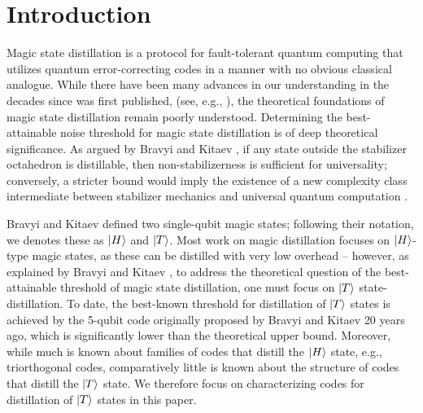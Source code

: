 \documentclass[11pt]{article}
\def\ket#1{\mathinner{|{#1}\rangle}}
\begin{document}
\eject \tableofcontents

\clearpage


\section{Introduction}
\label{Intro}


Magic state distillation \cite{MSD, knill2004faulttolerant} is a protocol for fault-tolerant quantum computing that utilizes quantum error-correcting codes in a manner with no obvious classical analogue. While there have been many advances in our understanding in the decades since \cite{MSD} was first published, (see, e.g., \cite{reichardt2005quantum, Reichardt_2009, ACB, CampbellAnwarBrowne, campbellEnhanced, PhysRevA.86.052329, PhysRevLett.120.050504, Haah2018codesprotocols, 2020golay, prakash2024low, nguyen2024quantum,wills2024constant, golowich2024asymptotically, tamiya2024polylog}), the theoretical foundations of magic state distillation remain poorly understood. Determining the best-attainable noise threshold for magic state distillation is of deep theoretical significance. As argued by Bravyi and Kitaev \cite{MSD}, if any state outside the stabilizer octahedron is distillable, then non-stabilizerness is sufficient for universality; conversely, a stricter bound would imply the existence of a new complexity class intermediate between stabilizer mechanics and universal quantum computation \cite{aaronson2004improved}. 


Bravyi and Kitaev \cite{MSD} defined two single-qubit magic states; following their notation, we denotes these as $\ket{H}$ and $\ket{T}$. 
Most work on magic distillation focuses on $\ket{H}$-type magic states, as these can be distilled with very low overhead -- however, as explained by Bravyi and Kitaev \cite{MSD}, to address the theoretical question of the best-attainable threshold of magic state distillation, one must focus on $\ket{T}$ state-distillation. To date, the best-known threshold for distillation of $\ket{T}$ states is achieved by the 5-qubit code originally proposed by Bravyi and Kitaev \cite{MSD} 20 years ago, which is significantly lower than the theoretical upper bound. Moreover, while much is known about families of codes that distill the $\ket{H}$ state, e.g., triorthogonal codes, comparatively little is known about the structure of codes that distill the $\ket{T}$ state. We therefore focus on characterizing codes for  distillation of $\ket{T}$ states in this paper. 
\end{document}
